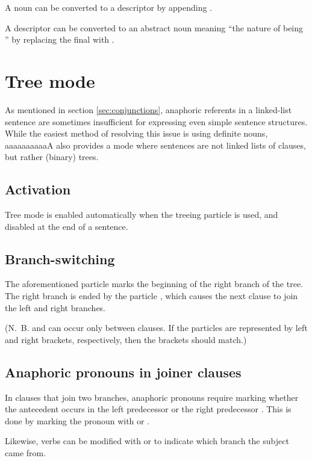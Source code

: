 \documentclass{book}
\newcommand{\lname}{aaaaaaaaaaA}
\begin{document}
A noun can be converted to a descriptor by appending .

A descriptor can be converted to an abstract noun meaning ``the nature of being \tl'' by replacing the final  with .

\chapter{Tree mode}

As mentioned in section \ref{sec:conjunctions}, anaphoric referents in a linked-list sentence are sometimes insufficient for expressing even simple sentence structures. While the easiest method of resolving this issue is using definite nouns, \lname{} also provides a mode where sentences are not linked lists of clauses, but rather (binary) trees.

\section{Activation}

Tree mode is enabled automatically when the treeing particle  is used, and disabled at the end of a sentence.

\section{Branch-switching}

The aforementioned particle  marks the beginning of the right branch of the tree. The right branch is ended by the particle , which causes the next clause to join the left and right branches.

(N.~B.  and  can occur only between clauses. If the particles are represented by left and right brackets, respectively, then the brackets should match.)

\section{Anaphoric pronouns in joiner clauses}

In clauses that join two branches, anaphoric pronouns require marking whether the antecedent occurs in the left predecessor  or the right predecessor . This is done by marking the pronoun with  or .

Likewise, verbs can be modified with  or  to indicate which branch the subject came from.
\end{document}
